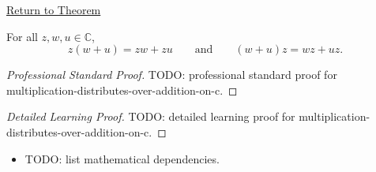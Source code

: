 \newpage
{}
\label{prf:multiplication-distributes-over-addition-on-c}

\begin{remark*}[Return]
\hyperref[thm:multiplication-distributes-over-addition-on-c]{Return to Theorem}
\end{remark*}

\begin{theorem*}
For all \(z,w,u\in\mathbb{C}\),
\[
z(w+u)=zw+zu
\qquad\text{and}\qquad
(w+u)z=wz+uz.
\]
\end{theorem*}

\begin{proof}[Professional Standard Proof]
\LRAProofBodyStart
TODO: professional standard proof for multiplication-distributes-over-addition-on-c.
\end{proof}

\begin{proof}[Detailed Learning Proof]
\LRAProofBodyStart
TODO: detailed learning proof for multiplication-distributes-over-addition-on-c.
\end{proof}

\begin{remark*}
\end{remark*}

\begin{dependencies}
\begin{itemize}
  \item TODO: list mathematical dependencies.
\end{itemize}
\end{dependencies}

\clearpage
